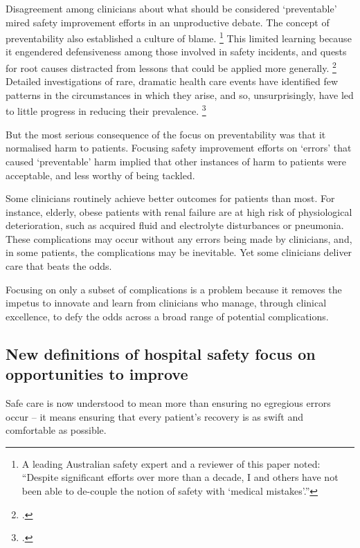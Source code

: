 \documentclass[FrontPage]{grattan}
\begin{document}
Disagreement among clinicians about what should be considered `preventable' mired safety improvement efforts in an unproductive debate.
The concept of preventability also established a culture of blame.%
	\footnote{A leading Australian safety expert and a reviewer of this paper noted: ``Despite significant efforts over more than a decade, I and others have not been able to de-couple the notion of safety with `medical mistakes'.''}
This limited learning because it engendered defensiveness among those involved in safety incidents, and quests for root causes distracted from lessons that could be applied more generally.%
	\footcites{Cook-Nemeth-2010-Those-found-responsible-have-been-sacked}{hayward2001estimating}{Shojania541-Temporal-trends-in-patient-safety-Netherlands}{Vincent-2016-Safer-Healthcare}
Detailed investigations of rare, dramatic health care events have identified few patterns in the circumstances in which they arise, and so, unsurprisingly, have led to little progress in reducing their prevalence.%
	\footcites{Wears-2016-our-basic-premises-hidden-assumptions}{kellogg2017current}

But the most serious consequence of the focus on preventability was that it normalised harm to patients.
Focusing safety improvement efforts on `errors' that caused `preventable' harm implied that other instances of harm to patients were acceptable, and less worthy of being tackled.

Some clinicians routinely achieve better outcomes for patients than most.
For instance, elderly, obese patients with renal failure are at high risk of physiological deterioration, such as acquired fluid and electrolyte disturbances or pneumonia.
These complications may occur without any errors being made by clinicians, and, in some patients, the complications may be inevitable.
Yet some clinicians deliver care that beats the odds.

Focusing on only a subset of complications is a problem because it removes the impetus to innovate and learn from clinicians who manage, through clinical excellence, to defy the odds across a broad range of potential complications.

\subsection{New definitions of hospital safety focus on opportunities to improve}\label{subsec:new-definitions-of-hospital-safety-focus-on-opportunities-to-improve}

Safe care is now understood to mean more than ensuring no egregious errors occur -- it means ensuring that every patient's recovery is as swift and comfortable as possible.
\end{document}
